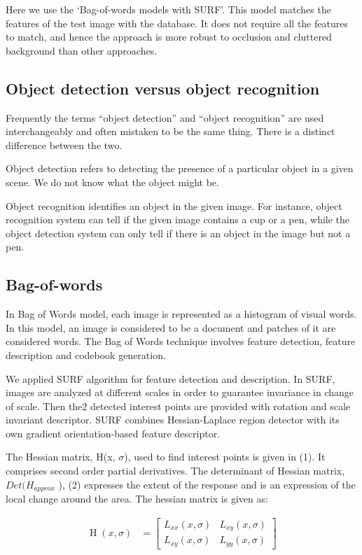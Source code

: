 \documentclass[journal,twoside]{IEEEtran}
\DeclareMathOperator{\Hessian}{H}
\begin{document}
Here we use the ‘Bag-of-words models with SURF’. This
model matches the features of the test image with the
database. It does not require all the features to match, and
hence the approach is more robust to occlusion and cluttered
background than other approaches.

\subsection{Object detection versus object recognition}

Frequently the terms “object detection” and “object
recognition” are used interchangeably and often mistaken to
be the same thing. There is a distinct difference between the two.

Object detection refers to detecting the presence of a
particular object in a given scene. We do not know what the
object might be.

Object recognition identifies an object in the given image.
For instance, object recognition system can tell if the given
image contains a cup or a pen, while the object detection
system can only tell if there is an object in the image but not a
pen.

\subsection{Bag-of-words}

In Bag of Words model, each image is represented as a
histogram of visual words. In this model, an image is
considered to be a document and patches of it are considered
words. The Bag of Words technique involves feature
detection, feature description and codebook generation. \cite{Grauman2011}

We applied SURF algorithm for feature detection and
description. In SURF, images are analyzed at different scales
in order to guarantee invariance in change of scale. Then the2
detected interest points are provided with rotation and scale
invariant descriptor. SURF combines Hessian-Laplace 
region detector with its own gradient orientation-based feature
descriptor. \cite{Bay2006}

The Hessian matrix, H(x, \(\sigma\)), used to find interest points is
given in (1). It comprises second order partial derivatives. The
determinant of Hessian matrix, \(Det(H_{approx}\) ), (2) expresses
the extent of the response and is an expression of the local
change around the area. The hessian matrix is given as:

    \begin{align}
        \Hessian\left( x,\sigma \right) &= 
        \begin{bmatrix}
            L_{xx}\left( x,\sigma \right) & L_{xy}\left( x,\sigma\right) \\
            L_{xy}\left( x,\sigma\right) & L_{yy}\left( x,\sigma\right)
        \end{bmatrix}
    \end{align}
\end{document}
